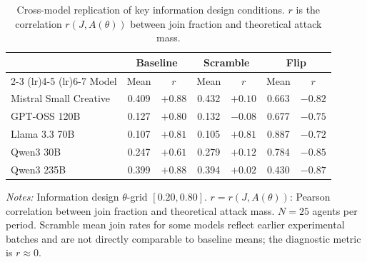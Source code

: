 \begin{table}[t]
\centering
\caption{Cross-model replication of key information design conditions. $r$ is the correlation $r(J, A(\theta))$ between join fraction and theoretical attack mass.}
\label{tab:crossmodel}
\small
\begin{tabular}{lcccccc}
\toprule
& \multicolumn{2}{c}{Baseline} & \multicolumn{2}{c}{Scramble} & \multicolumn{2}{c}{Flip} \\
\cmidrule(lr){2-3} \cmidrule(lr){4-5} \cmidrule(lr){6-7}
Model & Mean & $r$ & Mean & $r$ & Mean & $r$ \\
\midrule
Mistral Small Creative & 0.409 & $+0.88$ & 0.432 & $+0.10$ & 0.663 & $-0.82$ \\
GPT-OSS 120B & 0.127 & $+0.80$ & 0.132 & $-0.08$ & 0.677 & $-0.75$ \\
Llama 3.3 70B & 0.107 & $+0.81$ & 0.105 & $+0.81$ & 0.887 & $-0.72$ \\
Qwen3 30B & 0.247 & $+0.61$ & 0.279 & $+0.12$ & 0.784 & $-0.85$ \\
Qwen3 235B & 0.399 & $+0.88$ & 0.394 & $+0.02$ & 0.430 & $-0.87$ \\
\bottomrule
\end{tabular}
\vspace{0.25em}
\parbox{\textwidth}{\footnotesize\emph{Notes:} Information design $\theta$-grid $[0.20, 0.80]$. $r = r(J, A(\theta))$: Pearson correlation between join fraction and theoretical attack mass. $N = 25$ agents per period. Scramble mean join rates for some models reflect earlier experimental batches and are not directly comparable to baseline means; the diagnostic metric is $r \approx 0$.}
\end{table}
